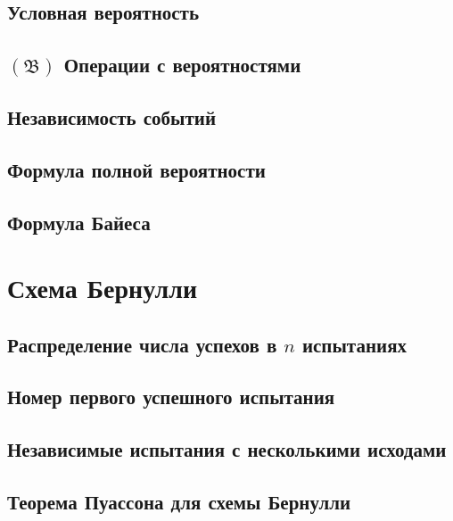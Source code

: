 \subsection{Условная вероятность}


\subsection{\texorpdfstring{$(\mathfrak{B})$}{} Операции с вероятностями}


\subsection{Независимость событий}


\subsection{Формула полной вероятности}


\subsection{Формула Байеса}





\section{Схема Бернулли}

\subsection{Распределение числа успехов в \texorpdfstring{$n$}{n} испытаниях}


\subsection{Номер первого успешного испытания}


\subsection{Независимые испытания с несколькими исходами}


\subsection{Теорема Пуассона для схемы Бернулли}





